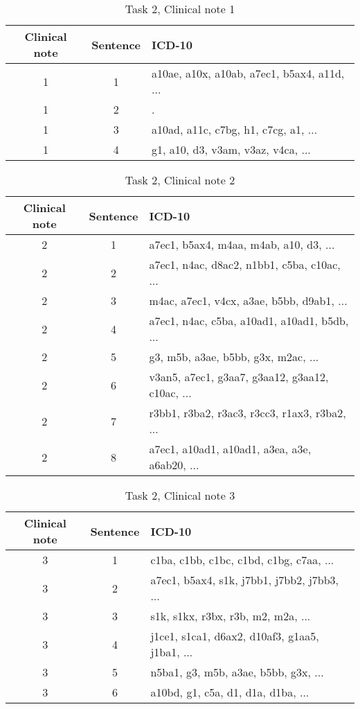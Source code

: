 \begin{table}[htbp] \footnotesize \center
\caption{Task 2, Clinical note 1 \label{tab:t2c1}}
\begin{tabularx}{\textwidth}{c c X}
    \toprule
    Clinical note & Sentence & ICD-10 \\
    \midrule
	 1 & 1 & a10ae, a10x, a10ab, a7ec1, b5ax4, a11d, ... \\
	 1 & 2 & . \\
	 1 & 3 & a10ad, a11c, c7bg, h1, c7cg, a1, ... \\
	 1 & 4 & g1, a10, d3, v3am, v3az, v4ca, ... \\
	\bottomrule
\end{tabularx}
\end{table}


\begin{table}[htbp] \footnotesize \center
\caption{Task 2, Clinical note 2 \label{tab:t2c2}}
\begin{tabularx}{\textwidth}{c c X}
    \toprule
    Clinical note & Sentence & ICD-10 \\
    \midrule
	 2 & 1 & a7ec1, b5ax4, m4aa, m4ab, a10, d3, ... \\
	 2 & 2 & a7ec1, n4ac, d8ac2, n1bb1, c5ba, c10ac, ... \\
	 2 & 3 & m4ac, a7ec1, v4cx, a3ae, b5bb, d9ab1, ... \\
	 2 & 4 & a7ec1, n4ac, c5ba, a10ad1, a10ad1, b5db, ... \\
	 2 & 5 & g3, m5b, a3ae, b5bb, g3x, m2ac, ... \\
	 2 & 6 & v3an5, a7ec1, g3aa7, g3aa12, g3aa12, c10ac, ... \\
	 2 & 7 & r3bb1, r3ba2, r3ac3, r3cc3, r1ax3, r3ba2, ... \\
	 2 & 8 & a7ec1, a10ad1, a10ad1, a3ea, a3e, a6ab20, ... \\
	\bottomrule
\end{tabularx}
\end{table}


\begin{table}[htbp] \footnotesize \center
\caption{Task 2, Clinical note 3 \label{tab:t2c3}}
\begin{tabularx}{\textwidth}{c c X}
    \toprule
    Clinical note & Sentence & ICD-10 \\
    \midrule
	 3 & 1 & c1ba, c1bb, c1bc, c1bd, c1bg, c7aa, ... \\
	 3 & 2 & a7ec1, b5ax4, s1k, j7bb1, j7bb2, j7bb3, ... \\
	 3 & 3 & s1k, s1kx, r3bx, r3b, m2, m2a, ... \\
	 3 & 4 & j1ce1, s1ca1, d6ax2, d10af3, g1aa5, j1ba1, ... \\
	 3 & 5 & n5ba1, g3, m5b, a3ae, b5bb, g3x, ... \\
	 3 & 6 & a10bd, g1, c5a, d1, d1a, d1ba, ... \\
	\bottomrule
\end{tabularx}
\end{table}


